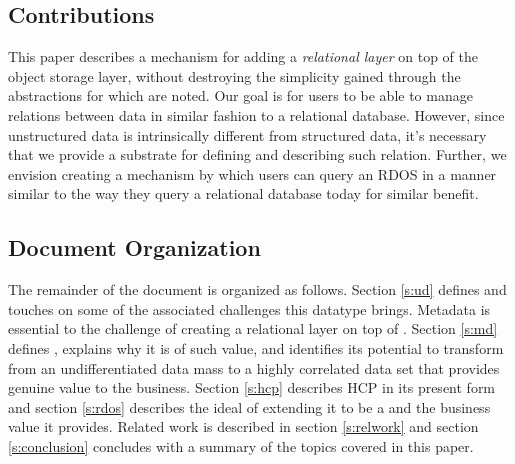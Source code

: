 \subsection{Contributions}
This paper describes a mechanism for adding a \emph{relational layer} on top of the object storage layer, without destroying the simplicity gained through the abstractions for which \oss{} are noted. Our goal is for users to be able to manage relations between data in similar fashion to a relational database. However, since unstructured data is intrinsically different from structured data, it's necessary that we provide a substrate for defining and describing such relation. Further, we envision creating a mechanism by which users can query an RDOS in a manner similar to the way they query a relational database today for similar benefit.

\subsection{Document Organization}
The remainder of the document is organized as follows. Section \ref{s:ud} defines \ud{} and touches on some of the associated challenges this datatype brings. Metadata is essential to the challenge of creating a relational layer on top of \ud{}. Section \ref{s:md} defines \md{}, explains why it is of such value, and identifies its potential to transform \ud{} from an undifferentiated data mass to a highly correlated data set that provides genuine value to the business. Section \ref{s:hcp} describes HCP in its present form and section \ref{s:rdos} describes the ideal of extending it to be a \RDOS{} and the business value it provides. Related work is described in section \ref{s:relwork}  and section \ref{s:conclusion} concludes with a summary of the topics covered in this paper.
